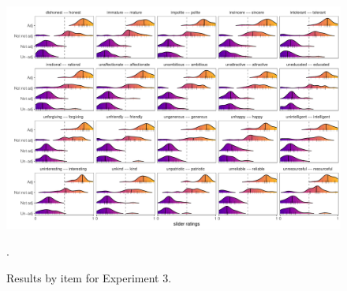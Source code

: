 \documentclass[floatsintext,doc]{apa6}
\begin{document}
\begin{figure}[t]
\centering \includegraphics{figs/expt3_byItem_densities.pdf}
\caption{Results by item for Experiment 3.}.\label{fig:items_expt3}
\end{figure}



\newpage




\setlength{\bibleftmargin}{.125in}
\setlength{\bibindent}{-\bibleftmargin}


\end{document}
